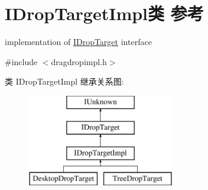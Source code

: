 \hypertarget{class_i_drop_target_impl}{}\section{I\+Drop\+Target\+Impl类 参考}
\label{class_i_drop_target_impl}


implementation of \hyperlink{interface_i_drop_target}{I\+Drop\+Target} interface  




{\ttfamily \#include $<$dragdropimpl.\+h$>$}

类 I\+Drop\+Target\+Impl 继承关系图\+:\begin{figure}[H]
\begin{center}
\leavevmode
\includegraphics[height=4.000000cm]{class_i_drop_target_impl}
\end{center}
\end{figure}
